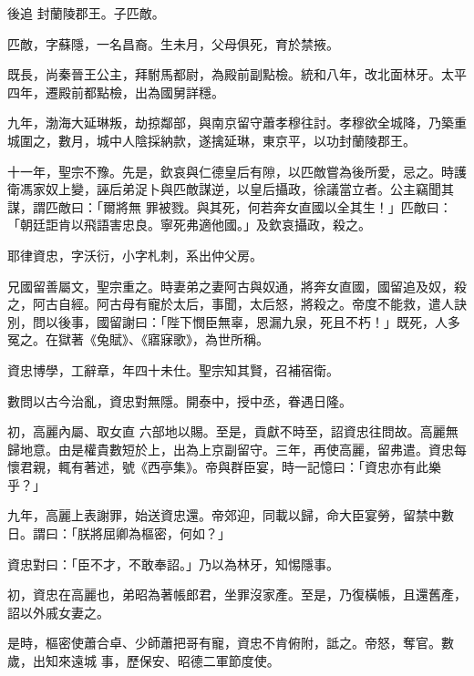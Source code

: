 \begin{pinyinscope}
 後追
 封蘭陵郡王。子匹敵。



 匹敵，字蘇隱，一名昌裔。生未月，父母俱死，育於禁掖。



 既長，尚秦晉王公主，拜駙馬都尉，為殿前副點檢。統和八年，改北面林牙。太平四年，遷殿前都點檢，出為國舅詳穩。



 九年，渤海大延琳叛，劫掠鄰部，與南京留守蕭孝穆往討。孝穆欲全城降，乃築重城圍之，數月，城中人陰採納款，遂擒延琳，東京平，以功封蘭陵郡王。



 十一年，聖宗不豫。先是，欽哀與仁德皇后有隙，以匹敵嘗為後所愛，忌之。時護衛馮家奴上變，誣后弟浞卜與匹敵謀逆，以皇后攝政，徐議當立者。公主竊聞其謀，謂匹敵曰：「爾將無
 罪被戮。與其死，何若奔女直國以全其生！」匹敵曰：「朝廷詎肯以飛語害忠良。寧死弗適他國。」及欽哀攝政，殺之。



 耶律資忠，字沃衍，小字札刺，系出仲父房。



 兄國留善屬文，聖宗重之。時妻弟之妻阿古與奴通，將奔女直國，國留追及奴，殺之，阿古自經。阿古母有寵於太后，事聞，太后怒，將殺之。帝度不能救，遣人訣別，問以後事，國留謝曰：「陛下憫臣無辜，恩漏九泉，死且不朽！」既死，人多冤之。在獄著《兔賦》、《寤寐歌》，為世所稱。



 資忠博學，工辭章，年四十未仕。聖宗知其賢，召補宿衛。



 數問以古今治亂，資忠對無隱。開泰中，授中丞，眷遇日隆。



 初，高麗內屬、取女直
 六部地以賜。至是，貢獻不時至，詔資忠往問故。高麗無歸地意。由是權貴數短於上，出為上京副留守。三年，再使高麗，留弗遣。資忠每懷君親，輒有著述，號《西亭集》。帝與群臣宴，時一記憶曰：「資忠亦有此樂乎？」



 九年，高麗上表謝罪，始送資忠還。帝郊迎，同載以歸，命大臣宴勞，留禁中數日。謂曰：「朕將屈卿為樞密，何如？」



 資忠對曰：「臣不才，不敢奉詔。」乃以為林牙，知惕隱事。



 初，資忠在高麗也，弟昭為著帳郎君，坐罪沒家產。至是，乃復橫帳，且還舊產，詔以外戚女妻之。



 是時，樞密使蕭合卓、少師蕭把哥有寵，資忠不肯俯附，詆之。帝怒，奪官。數歲，出知來遠城
 事，歷保安、昭德二軍節度使。




\end{pinyinscope}
